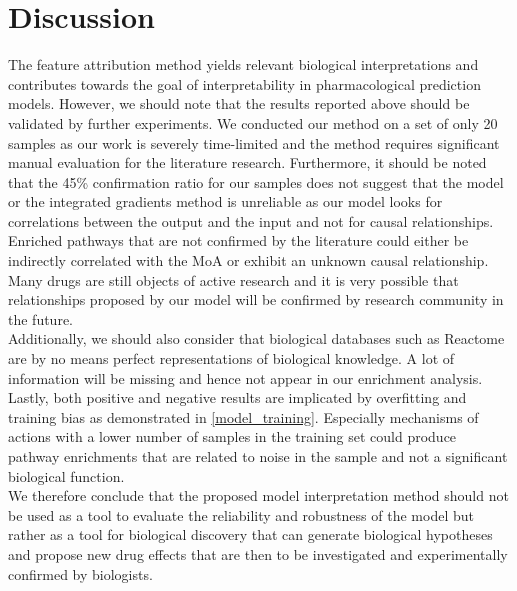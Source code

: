 \documentclass[bsc,frontabs,twoside,singlespacing,parskip,deptreport]{infthesis}     %
\let\Oldsection\section
\renewcommand{\section}{\FloatBarrier\Oldsection}
\begin{document}
\section{Discussion}
The feature attribution method yields relevant biological  interpretations and contributes towards the goal of interpretability in pharmacological prediction models. However, we should note that the results reported above should be validated by further experiments. We conducted our method on a set of only 20 samples as our work is severely time-limited and the method requires significant manual evaluation for the literature research.
Furthermore, it should be noted that the 45\% confirmation ratio for our samples does not suggest that the model or the integrated gradients method is unreliable  as our model looks for correlations between the output and the input and not for causal relationships. Enriched pathways that are not confirmed by the literature could either be indirectly correlated with the MoA or exhibit an unknown causal relationship.  Many drugs are still objects of active research and it is very possible that relationships proposed by our model will be confirmed by research community in the future. \\
Additionally, we should also consider that biological databases such as Reactome are by no means perfect representations of biological knowledge. A lot of information will be missing and hence not appear in our enrichment analysis. \\
Lastly, both positive and negative results are implicated by overfitting and training bias as demonstrated in \ref{model_training}. Especially mechanisms of actions with a lower number of samples in the training set could produce pathway enrichments that are related to noise in the sample and not a significant biological function. \\
We therefore conclude that the proposed model interpretation method should not be used as a tool to evaluate the reliability and robustness of the model but rather as a tool for biological discovery that can generate biological hypotheses  and propose new drug effects that are then to be investigated and experimentally confirmed by biologists.






\end{document}
